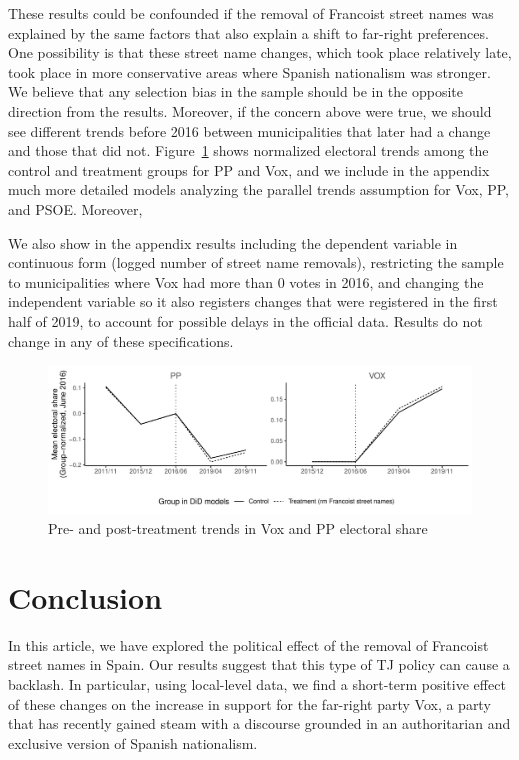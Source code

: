 \documentclass[12pt, notitlepage]{article}
\begin{document}
These results could be confounded if the removal of Francoist street names was explained by the same factors that also explain a shift to far-right preferences.
One possibility is that these street name changes, which took place relatively late, took place in more conservative areas where Spanish nationalism was stronger.
We believe that any selection bias in the sample should be in the opposite direction from the results.
Moreover, if the concern above were true, we should see different trends before 2016 between municipalities that later had a change and those that did not.
Figure~\ref{fig:par_trends_norm} shows normalized electoral trends among the control and treatment groups for PP and Vox, and we include in the appendix much more detailed models analyzing the parallel trends assumption for Vox, PP, and PSOE.
Moreover,

We also show in the appendix results including the dependent variable in continuous form (logged number of street name removals), restricting the sample to municipalities where Vox had more than 0 votes in 2016, and changing the independent variable so it also registers changes that were registered in the first half of 2019, to account for possible delays in the official data.
Results do not change in any of these specifications.


\begin{figure}[htb!]
\centering

  \includegraphics[width = \textwidth]{img/par_trends_norm}

  \caption{Pre- and post-treatment trends in Vox and PP electoral share}\label{fig:par_trends_norm}

\end{figure}

\section*{Conclusion}

In this article, we have explored the political effect of the removal of Francoist street names in Spain.
Our results suggest that this type of TJ policy can cause a backlash.
In particular, using local-level data, we find a short-term positive effect of these changes on the increase in support for the far-right party Vox, a party that has recently gained steam with a discourse grounded in an authoritarian and exclusive version of Spanish nationalism.
\end{document}
